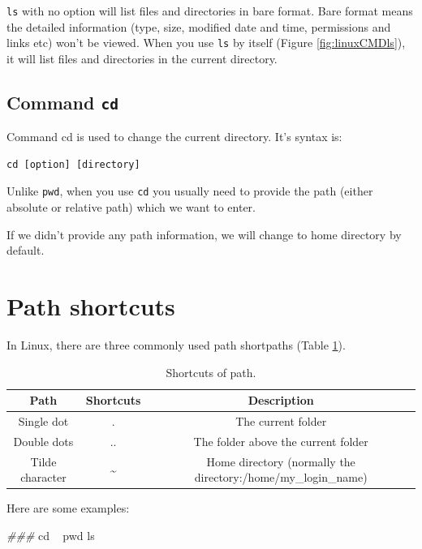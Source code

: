 \documentclass[]{book}
\makeatletter
\newenvironment{Shaded}{\begin{snugshade}}{\end{snugshade}}
\newcommand{\CommentTok}[1]{\textcolor[rgb]{0.56,0.35,0.01}{\textit{#1}}}
\newcommand{\FunctionTok}[1]{\textcolor[rgb]{0.00,0.00,0.00}{#1}}
\newcommand{\BuiltInTok}[1]{#1}
\newcommand{\NormalTok}[1]{#1}
\newenvironment{kframe}{%
\medskip{}
\setlength{\fboxsep}{.8em}
 \def\at@end@of@kframe{}%
 \ifinner\ifhmode%
  \def\at@end@of@kframe{\end{minipage}}%
  \begin{minipage}{\columnwidth}%
 \fi\fi%
 \def\FrameCommand##1{\hskip\@totalleftmargin \hskip-\fboxsep
 \colorbox{shadecolor}{##1}\hskip-\fboxsep
     \hskip-\linewidth \hskip-\@totalleftmargin \hskip\columnwidth}%
 \MakeFramed {\advance\hsize-\width
   \@totalleftmargin\z@ \linewidth\hsize
   \@setminipage}}%
 {\par\unskip\endMakeFramed%
 \at@end@of@kframe}
\renewenvironment{Shaded}{\begin{kframe}}{\end{kframe}}
\theoremstyle{definition}
\theoremstyle{definition}
\theoremstyle{definition}
\theoremstyle{remark}
\makeatother
\begin{document}
\texttt{ls} with no option will list files and directories in bare
format. Bare format means the detailed information (type, size, modified
date and time, permissions and links etc) won't be viewed. When you use
\texttt{ls} by itself (Figure \ref{fig:linuxCMDls}), it will list files
and directories in the current directory.

\subsection{\texorpdfstring{Command
\texttt{cd}}{Command cd}}\label{command-cd}

Command cd is used to change the current directory. It's syntax is:

\begin{verbatim}
cd [option] [directory]
\end{verbatim}

Unlike \texttt{pwd}, when you use \texttt{cd} you usually need to
provide the path (either absolute or relative path) which we want to
enter.

If we didn't provide any path information, we will change to home
directory by default.

\section{Path shortcuts}\label{path-shortcuts}

In Linux, there are three commonly used path shortpaths (Table
\ref{tab:linuxPathShortcuts}).



\begin{table}

\caption{\label{tab:linuxPathShortcuts}Shortcuts of path.}
\centering
\begin{tabular}[t]{c|c|c}
\hline
Path & Shortcuts & Description\\
\hline
Single dot & . & The current folder\\
\hline
Double dots & .. & The folder above the current folder\\
\hline
Tilde character & \textasciitilde{} & Home directory (normally the directory:/home/my\_login\_name)\\
\hline
\end{tabular}
\end{table}

Here are some examples:

\begin{Shaded}
\begin{Highlighting}[]
\CommentTok{### }
\BuiltInTok{cd}\NormalTok{ ~}
\BuiltInTok{pwd}
\FunctionTok{ls}
\end{Highlighting}
\end{Shaded}
\end{document}
